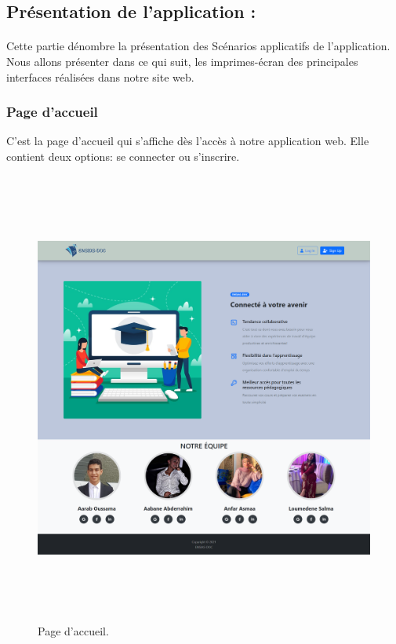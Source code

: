 \documentclass{article}
\begin{document}
{\vspace{1.2cm}
\subsection{Présentation de l'application :}
\onehalfspacing\paragraph{}{
Cette partie dénombre la présentation des Scénarios applicatifs de l'application. Nous allons présenter dans
ce qui suit, les imprimes-écran des principales interfaces réalisées dans notre site web.
}
\vspace{15cm}
\subsubsection{Page d'accueil}{C'est la page d'accueil qui s'affiche dès l'accès à notre application web. Elle contient deux options: se connecter ou s'inscrire.
}
\vspace{0.3cm}
\begin{figure}[H]
    \centering
    \includegraphics[width=17cm,height=15cm]{index.png}
    \caption{Page d'accueil.}
    \label{Page d'accueil.}
\end{figure}
\vspace{0.3cm}
}
\end{document}
